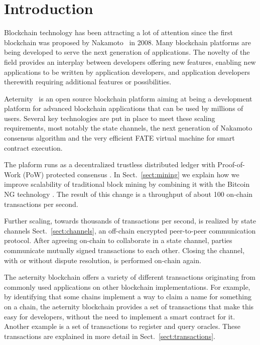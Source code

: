 \section{Introduction}

Blockchain technology has been attracting a lot of attention since the
first blockchain was proposed by Nakamoto~\cite{SN} in 2008.
Many blockchain platforms are being developed to serve the next
generation of applications. The novelty of the field provides an
interplay between developers offering new features, enabling new
applications to be written by application developers, and application
developers therewith requiring additional features or possibilities.

Aeternity~\cite{AE,UlfWigerCodeMesh2018} is an open source blockchain
platform aiming at being a development platform for
advanced blockchain applications that can be used by millions of
users. Several key technologies are put in place to meet these scaling
requirements, most notably the state channels, the next generation of
Nakamoto consensus algorithm and the very efficient FATE virtual
machine for smart contract execution.

The plaform runs as a decentralized trustless distributed
ledger with Proof-of-Work (PoW) protected consensus \cite{Tromp2015CuckooCA}.
In Sect.~\ref{sect:mining} we explain how we improve scalability of traditional
block mining by combining it with the Bitcoin NG technology
\cite{Eyal:2016:BSB:2930611.2930615}. The result of this change
is a throughput of about 100 on-chain transactions per second.

Further scaling, towards thousands of transactions per second, is
realized by state channels Sect.\ \ref{sect:channels}, an off-chain encrypted
peer-to-peer communication protocol. After agreeing on-chain to
collaborate in a state channel, parties communicate mutually signed
transactions to each other. Closing the channel, with or without
dispute resolution, is performed on-chain again.

The aeternity blockchain offers a variety of different transactions originating from commonly
used applications on other blockchain implementations. For example, by
identifying that some chains implement a way to claim a name for
something on a chain, the aeternity blockchain provides a set of
transactions that make this easy for developers, without the need to
implement a smart contract for it. Another example is a set of transactions to register and
query oracles. These transactions are explained in more detail in
Sect.\ \ref{sect:transactions}.

